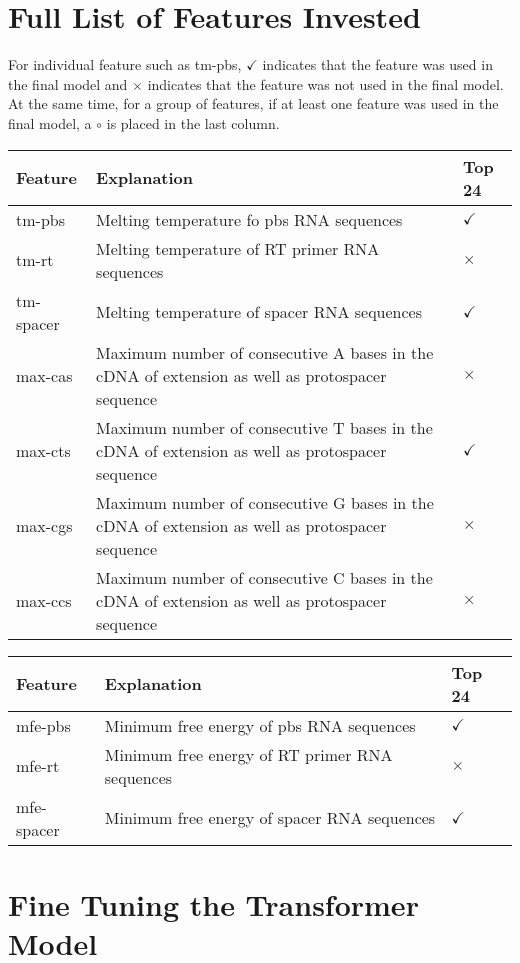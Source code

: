 \chapter{Full List of Features Invested}
\label{appendix:features}

For individual feature such as tm-pbs, $\checkmark$ indicates that the feature was used in the final model and $\times$ indicates that the feature was not used in the final model. At the same time, for a group of features, if at least one feature was used in the final model, a $\circ$ is placed in the last column. 

\begin{table}[ht]
    \centering
    \begin{tabular}{|p{}|p{}|p{}|}
        \hline
        \textbf{Feature} & \textbf{Explanation} & \textbf{Top 24} \\ 
        \hline
        tm-pbs& Melting temperature fo pbs RNA sequences & $\checkmark$ \\
        \hline
        tm-rt& Melting temperature of RT primer RNA sequences & $\times$ \\
        \hline
        tm-spacer& Melting temperature of spacer RNA sequences & $\checkmark$ \\
        \hline
        max-cas & Maximum number of consecutive A bases in the cDNA of extension as well as protospacer sequence & $\times$ \\
        \hline
        max-cts & Maximum number of consecutive T bases in the cDNA of extension as well as protospacer sequence & $\checkmark$ \\
        \hline
        max-cgs & Maximum number of consecutive G bases in the cDNA of extension as well as protospacer sequence & $\times$ \\
        \hline
        max-ccs & Maximum number of consecutive C bases in the cDNA of extension as well as protospacer sequence & $\times$ \\
        \hline
    \end{tabular}
\end{table}

\begin{table}[ht]
    \centering
    \begin{tabular}{|p{}|p{}|p{}|}
        \hline
        \textbf{Feature} & \textbf{Explanation} & \textbf{Top 24} \\ 
        \hline
        mfe-pbs & Minimum free energy of pbs RNA sequences & $\checkmark$ \\
        \hline
        mfe-rt & Minimum free energy of RT primer RNA sequences & $\times$ \\
        \hline
        mfe-spacer & Minimum free energy of spacer RNA sequences & $\checkmark$ \\
        \hline
    \end{tabular}
\end{table}

\chapter{Fine Tuning the Transformer Model}
\label{appendix:transformer-hyperparameter-tuning}